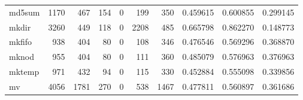 \begin{longtable}{lrrrrrrrrr}
md5sum    &                                1170 &                                             467 &                                            154 &                                             0 &                                            199 &                                          350 &                                           0.459615 &                               0.600855 &                             0.299145 \\
mkdir     &                                3260 &                                             449 &                                            118 &                                             0 &                                           2208 &                                          485 &                                           0.665798 &                               0.862270 &                             0.148773 \\
mkfifo    &                                 938 &                                             404 &                                             80 &                                             0 &                                            108 &                                          346 &                                           0.476546 &                               0.569296 &                             0.368870 \\
mknod     &                                 955 &                                             404 &                                             80 &                                             0 &                                            111 &                                          360 &                                           0.485079 &                               0.576963 &                             0.376963 \\
mktemp    &                                 971 &                                             432 &                                             94 &                                             0 &                                            115 &                                          330 &                                           0.452884 &                               0.555098 &                             0.339856 \\
mv        &                                4056 &                                            1781 &                                            270 &                                             0 &                                            538 &                                         1467 &                                           0.477811 &                               0.560897 &                             0.361686 \\

\end{longtable}
